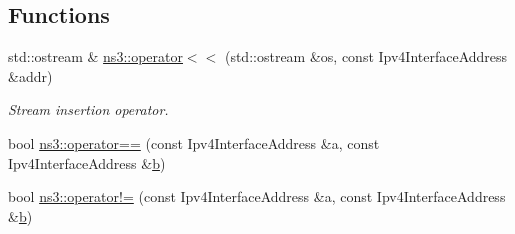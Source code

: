 \subsection*{Functions}
\begin{DoxyCompactItemize}
\item 
std\+::ostream \& \hyperlink{namespacens3_a3510ae794ab61c2e23a5e9511f11de44}{ns3\+::operator$<$$<$} (std\+::ostream \&os, const Ipv4\+Interface\+Address \&addr)
\begin{DoxyCompactList}\small\item\em Stream insertion operator. \end{DoxyCompactList}\item 
bool \hyperlink{namespacens3_a9ced9bd1da37694e2113a7008a19939f}{ns3\+::operator==} (const Ipv4\+Interface\+Address \&a, const Ipv4\+Interface\+Address \&\hyperlink{lte__pathloss_8m_a21ad0bd836b90d08f4cf640b4c298e7c}{b})
\item 
bool \hyperlink{namespacens3_a08b7237941893d63e6c0a24bec0d795d}{ns3\+::operator!=} (const Ipv4\+Interface\+Address \&a, const Ipv4\+Interface\+Address \&\hyperlink{lte__pathloss_8m_a21ad0bd836b90d08f4cf640b4c298e7c}{b})
\end{DoxyCompactItemize}
